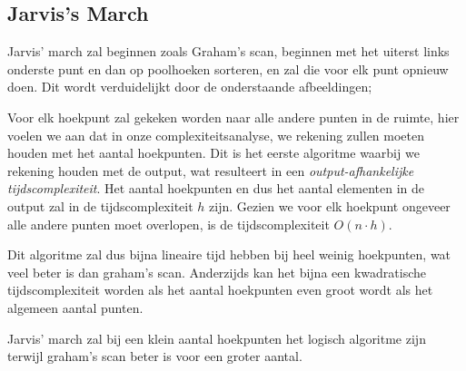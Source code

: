 \documentclass[12pt,a4paper]{article}
\begin{document}
	
	\subsection{Jarvis's March}
	Jarvis' march zal beginnen zoals Graham's scan, beginnen met het uiterst links onderste punt en dan op poolhoeken sorteren, en zal die voor elk punt opnieuw doen. Dit wordt verduidelijkt door de onderstaande afbeeldingen; 
	
	\begin{figure}[h]
		\centering
		\label{fig:jarvis' example}
	\end{figure}

	Voor elk hoekpunt zal gekeken worden naar alle andere punten in de ruimte, hier voelen we aan dat in onze complexiteitsanalyse, we rekening zullen moeten houden met het aantal hoekpunten. Dit is het eerste algoritme waarbij we rekening houden met de output, wat resulteert in een \textit{output-afhankelijke tijdscomplexiteit}. Het aantal hoekpunten en dus het aantal elementen in de output zal in de tijdscomplexiteit $h$ zijn. Gezien we voor elk hoekpunt ongeveer alle andere punten moet overlopen, is de tijdscomplexiteit $O(n\cdot h)$.
	
	Dit algoritme zal dus bijna lineaire tijd hebben bij heel weinig hoekpunten, wat veel beter is dan graham's scan. Anderzijds kan het bijna een kwadratische tijdscomplexiteit worden als het aantal hoekpunten even groot wordt als het algemeen aantal punten. 
	
	Jarvis' march zal bij een klein aantal hoekpunten het logisch algoritme zijn terwijl graham's scan beter is voor een groter aantal. 
	
\end{document}
